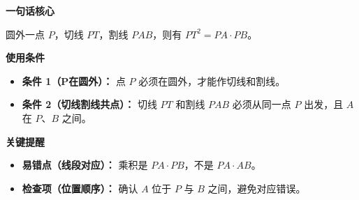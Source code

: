\begin{summarybox}
	\textbf{\textcolor{CSummary}{一句话核心}}

	圆外一点 $P$，切线 $PT$，割线 $PAB$，则有 $PT^{2}=PA\cdot PB$。

	\medskip
	\textbf{\textcolor{CSummary}{使用条件}}
	\begin{itemize}[leftmargin=*, itemsep=0.5em, topsep=0.4em]
		\item \textbf{条件 1（P在圆外）：} 点 $P$ 必须在圆外，才能作切线和割线。
		\item \textbf{条件 2（切线割线共点）：} 切线 $PT$ 和割线 $PAB$ 必须从同一点 $P$ 出发，且 $A$ 在 $P$、$B$ 之间。
	\end{itemize}

	\medskip
	\textbf{\textcolor{CSummary}{关键提醒}}
	\begin{itemize}[leftmargin=*, itemsep=0.5em, topsep=0.4em]
		\item \textbf{易错点（线段对应）：} 乘积是 $PA\cdot PB$，不是 $PA\cdot AB$。
		\item \textbf{检查项（位置顺序）：} 确认 $A$ 位于 $P$ 与 $B$ 之间，避免对应错误。
	\end{itemize}
\end{summarybox}
